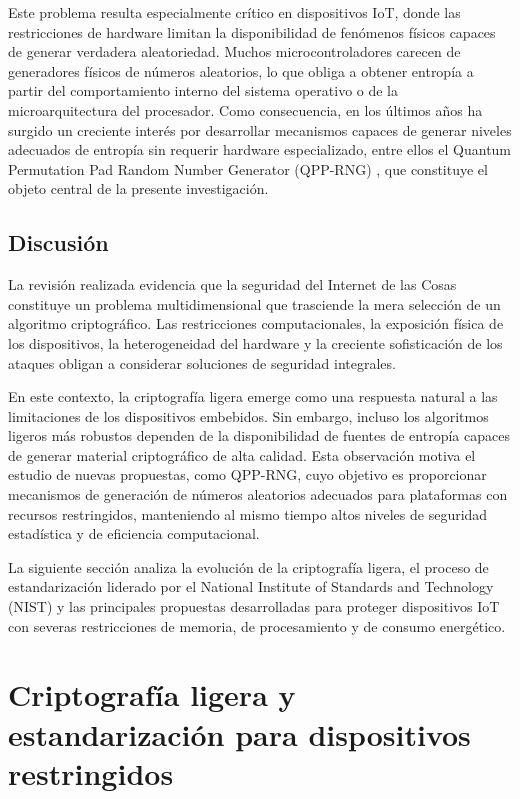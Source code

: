 Este problema resulta especialmente crítico en dispositivos IoT, donde las restricciones de hardware limitan la disponibilidad de fenómenos físicos capaces de generar verdadera aleatoriedad. Muchos microcontroladores carecen de generadores físicos de números aleatorios, lo que obliga a obtener entropía a partir del comportamiento interno del sistema operativo o de la microarquitectura del procesador. Como consecuencia, en los últimos años ha surgido un creciente interés por desarrollar mecanismos capaces de generar niveles adecuados de entropía sin requerir hardware especializado, entre ellos el Quantum Permutation Pad Random Number Generator (QPP-RNG) \cite{Kuang2025QPP-RNG:Randomness,Kuang2025IID-BasedJitter}, que constituye el objeto central de la presente investigación.

\subsection{Discusión}

La revisión realizada evidencia que la seguridad del Internet de las Cosas constituye un problema multidimensional que trasciende la mera selección de un algoritmo criptográfico. Las restricciones computacionales, la exposición física de los dispositivos, la heterogeneidad del hardware y la creciente sofisticación de los ataques obligan a considerar soluciones de seguridad integrales.

En este contexto, la criptografía ligera emerge como una respuesta natural a las limitaciones de los dispositivos embebidos. Sin embargo, incluso los algoritmos ligeros más robustos dependen de la disponibilidad de fuentes de entropía capaces de generar material criptográfico de alta calidad. Esta observación motiva el estudio de nuevas propuestas, como QPP-RNG, cuyo objetivo es proporcionar mecanismos de generación de números aleatorios adecuados para plataformas con recursos restringidos, manteniendo al mismo tiempo altos niveles de seguridad estadística y de eficiencia computacional.

La siguiente sección analiza la evolución de la criptografía ligera, el proceso de estandarización liderado por el National Institute of Standards and Technology (NIST) y las principales propuestas desarrolladas para proteger dispositivos IoT con severas restricciones de memoria, de procesamiento y de consumo energético.


\section{Criptografía ligera y estandarización para dispositivos restringidos}

